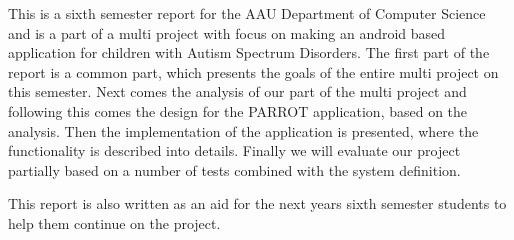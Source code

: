 This is a sixth semester report for the AAU Department of Computer Science and is a part of a multi project with focus on making an android based application for children with Autism Spectrum Disorders. The first part of the report is a common part, which presents the goals of the entire multi project on this semester. Next comes the analysis of our part of the multi project and following this comes the design for the  PARROT application, based on the analysis.
Then the implementation of the application is presented, where the functionality is described into details. 
Finally we will  evaluate our project partially based on a number of tests combined with the system definition.

This report is also written as an aid for the next years sixth semester students to help them continue on the project.   





